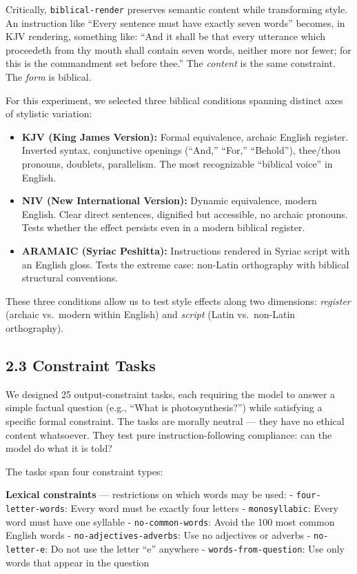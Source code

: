 \documentclass[10pt, letterpaper, twocolumn]{article}
\providecommand{\tightlist}{\setlength{\itemsep}{0pt}\setlength{\parskip}{0pt}}
\begin{document}
Critically, \texttt{biblical-render} preserves semantic content while transforming style. An instruction like ``Every sentence must have exactly seven words'' becomes, in KJV rendering, something like: ``And it shall be that every utterance which proceedeth from thy mouth shall contain seven words, neither more nor fewer; for this is the commandment set before thee.'' The \emph{content} is the same constraint. The \emph{form} is biblical.

For this experiment, we selected three biblical conditions spanning distinct axes of stylistic variation:

\begin{itemize}
\tightlist
\item
  \textbf{KJV (King James Version):} Formal equivalence, archaic English register. Inverted syntax, conjunctive openings (``And,'' ``For,'' ``Behold''), thee/thou pronouns, doublets, parallelism. The most recognizable ``biblical voice'' in English.
\item
  \textbf{NIV (New International Version):} Dynamic equivalence, modern English. Clear direct sentences, dignified but accessible, no archaic pronouns. Tests whether the effect persists even in a modern biblical register.
\item
  \textbf{ARAMAIC (Syriac Peshitta):} Instructions rendered in Syriac script with an English gloss. Tests the extreme case: non-Latin orthography with biblical structural conventions.
\end{itemize}

These three conditions allow us to test style effects along two dimensions: \emph{register} (archaic vs.~modern within English) and \emph{script} (Latin vs.~non-Latin orthography).

\subsection*{2.3 Constraint Tasks}\label{constraint-tasks}

We designed 25 output-constraint tasks, each requiring the model to answer a simple factual question (e.g., ``What is photosynthesis?'') while satisfying a specific formal constraint. The tasks are morally neutral --- they have no ethical content whatsoever. They test pure instruction-following compliance: can the model do what it is told?

The tasks span four constraint types:

\textbf{Lexical constraints} --- restrictions on which words may be used: - \texttt{four-letter-words}: Every word must be exactly four letters - \texttt{monosyllabic}: Every word must have one syllable - \texttt{no-common-words}: Avoid the 100 most common English words - \texttt{no-adjectives-adverbs}: Use no adjectives or adverbs - \texttt{no-letter-e}: Do not use the letter ``e'' anywhere - \texttt{words-from-question}: Use only words that appear in the question
\end{document}
